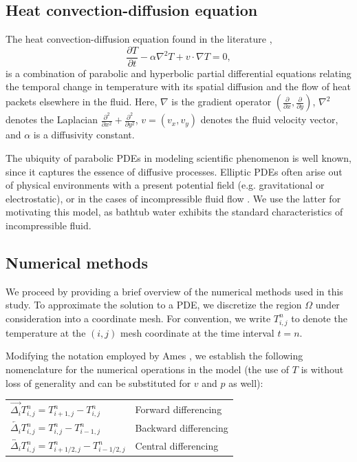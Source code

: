 \documentclass[12pt]{article}
\newcommand{\la}{\overleftarrow}
\newcommand{\ra}{\overrightarrow}
\newcommand{\ca}{\overleftrightarrow}
\begin{document}
\subsection{Heat convection-diffusion equation}

The heat convection-diffusion equation found in the literature
\cite{convection-diffusion},
\begin{equation}
    \frac{\partial T}{\partial t} - \alpha \nabla^2 T + v \cdot \nabla T =
    0,
    \label{eq:\theequation}
\end{equation}
is a combination of parabolic and hyperbolic partial differential equations
relating the temporal change in temperature with its spatial diffusion and
the flow of heat packets elsewhere in the fluid.     Here, $\nabla$ is the
gradient operator $\left( \frac{\partial}{\partial x},
\frac{\partial}{\partial y} \right)$, $\nabla^2$ denotes the Laplacian
$\frac{\partial^2}{\partial x^2} + \frac{\partial^2}{\partial y^2}$, $v =
(v_x, v_y)$ denotes the fluid velocity vector, and $\alpha$ is a diffusivity
constant.

The ubiquity of parabolic PDEs in modeling scientific phenomenon is well
known, since it captures the essence of diffusive processes. Elliptic PDEs
often arise out of physical environments with a present potential field
(e.g.  gravitational or electrostatic), or in the cases of incompressible
fluid flow \cite{convection-diffusion, ames}. We use the latter for
motivating this model, as bathtub water exhibits the standard
characteristics of incompressible fluid.

\subsection{Numerical methods}

We proceed by providing a brief overview of the numerical methods used in
this study. To approximate the solution to a PDE, we discretize the region
$\Omega$ under consideration into a coordinate mesh. For convention, we
write $T_{i,j}^{n}$ to denote the temperature at the $(i,j)$ mesh coordinate
at the time interval $t=n$. 

Modifying the notation employed by Ames \cite{ames}, we establish the
following nomenclature for the numerical operations in the model (the use of $T$
is without loss of generality and can be substituted for $v$ and $p$ as well):

\begin{center}
    \begin{tabular}[]{ll}
        $\ra{\Delta_i} T_{i,j}^n = T_{i+1,j}^n - T_{i,j}^n$ & Forward
        differencing \\
        $\la{\Delta_i} T_{i,j}^n = T_{i,j}^n - T_{i-1,j}^n$ & Backward differencing \\
        $\ca{\Delta_i} T_{i,j}^n = T_{i+1/2,j}^n - T_{i-1/2,j}^n$ & Central differencing
    \end{tabular}
\end{center}
\end{document}
